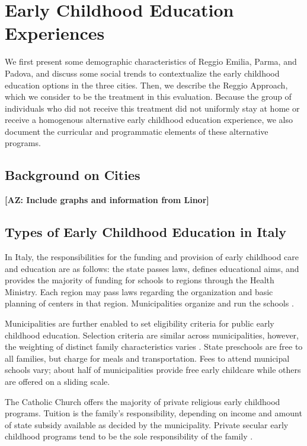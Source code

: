 \section{Early Childhood Education Experiences}
\label{sec:eceexperiences}

We first present some demographic characteristics of Reggio Emilia, Parma, and Padova, and discuss some social trends to contextualize the early childhood education options in the three cities. Then, we describe the Reggio Approach, which we consider to be the treatment in this evaluation. Because the group of individuals who did not receive this treatment did not uniformly stay at home or receive a homogenous alternative early childhood education experience, we also document the curricular and programmatic elements of these alternative programs.

\subsection{Background on Cities}
\label{sec:backgroundcities}

\textbf{[AZ: Include graphs and information from Linor]}

\subsection{Types of Early Childhood Education in Italy}

In Italy, the responsibilities for the funding and provision of early childhood care and education are as follows: the state passes laws, defines educational aims, and provides the majority of funding for schools to regions through the Health Ministry. Each region may pass laws regarding the organization and basic planning of centers in that region. Municipalities organize and run the schools \citep{Becchi-Ferrari_1990_Pub-Inf-Centres-Italy}. 

Municipalities are further enabled to set eligibility criteria for public early childhood education. Selection criteria are similar across municipalities, however, the weighting of distinct family characteristics varies \citep{Del-Boca-etal_2016_CESifo-ES}. State preschools are free to all families, but charge for meals and transportation. Fees to attend municipal schools vary; about half of municipalities provide free early childcare while others are offered on a sliding scale.

The Catholic Church offers the majority of private religious early childhood programs. Tuition is the family's responsibility, depending on income and amount of state subsidy available as decided by the municipality. Private secular early childhood programs tend to be the sole responsibility of the family \citep{Hohnerlein_2009_Paradox-Public-Preschools}.

